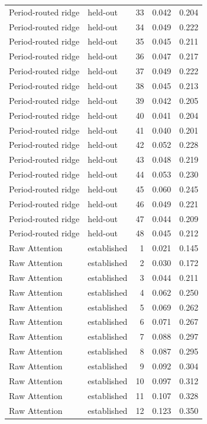 \begin{tabular}{llrrr}
Period-routed ridge & held-out & 33 & 0.042 & 0.204 \\
Period-routed ridge & held-out & 34 & 0.049 & 0.222 \\
Period-routed ridge & held-out & 35 & 0.045 & 0.211 \\
Period-routed ridge & held-out & 36 & 0.047 & 0.217 \\
Period-routed ridge & held-out & 37 & 0.049 & 0.222 \\
Period-routed ridge & held-out & 38 & 0.045 & 0.213 \\
Period-routed ridge & held-out & 39 & 0.042 & 0.205 \\
Period-routed ridge & held-out & 40 & 0.041 & 0.204 \\
Period-routed ridge & held-out & 41 & 0.040 & 0.201 \\
Period-routed ridge & held-out & 42 & 0.052 & 0.228 \\
Period-routed ridge & held-out & 43 & 0.048 & 0.219 \\
Period-routed ridge & held-out & 44 & 0.053 & 0.230 \\
Period-routed ridge & held-out & 45 & 0.060 & 0.245 \\
Period-routed ridge & held-out & 46 & 0.049 & 0.221 \\
Period-routed ridge & held-out & 47 & 0.044 & 0.209 \\
Period-routed ridge & held-out & 48 & 0.045 & 0.212 \\
Raw Attention & established & 1 & 0.021 & 0.145 \\
Raw Attention & established & 2 & 0.030 & 0.172 \\
Raw Attention & established & 3 & 0.044 & 0.211 \\
Raw Attention & established & 4 & 0.062 & 0.250 \\
Raw Attention & established & 5 & 0.069 & 0.262 \\
Raw Attention & established & 6 & 0.071 & 0.267 \\
Raw Attention & established & 7 & 0.088 & 0.297 \\
Raw Attention & established & 8 & 0.087 & 0.295 \\
Raw Attention & established & 9 & 0.092 & 0.304 \\
Raw Attention & established & 10 & 0.097 & 0.312 \\
Raw Attention & established & 11 & 0.107 & 0.328 \\
Raw Attention & established & 12 & 0.123 & 0.350 \\

\end{tabular}
